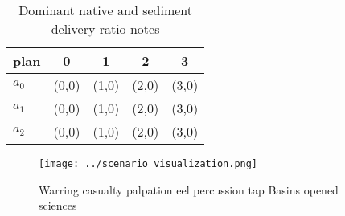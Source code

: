 \documentclass[a4paper]{article}
\begin{document}
\begin{table}
\begin{adjustbox}{width=0.5\columnwidth}
\begin{tabular}{|l|l|l|l|l|}
\hline
\textbf{plan} & \multicolumn{1}{c|}{\textbf{0}} & \multicolumn{1}{c|}{\textbf{1}} & \multicolumn{1}{c|}{\textbf{2}} & \multicolumn{1}{c|}{\textbf{3}} \\ \hline
\textbf{$a_0$}  & (0,0) & (1,0) & (2,0) & (3,0) \\ \hline
\textbf{$a_1$}  & (0,0) & (1,0) & (2,0) & (3,0) \\ \hline
\textbf{$a_2$}  & (0,0) & (1,0) & (2,0) & (3,0) \\ \hline
\end{tabular}
\end{adjustbox}
\caption{Dominant native and sediment delivery ratio notes
}
\end{table}

\begin{figure}
\centering
\texttt{[image: ../scenario\_visualization.png]}
\caption{Warring casualty palpation eel percussion tap Basins opened sciences 
}
\end{figure}
 
\end{document}
